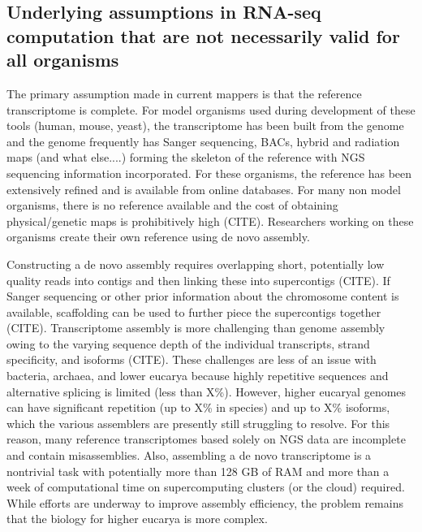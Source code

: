 \documentclass[10pt]{article}
\begin{document}

\subsection*{Underlying assumptions in RNA-seq computation that are not necessarily valid for all organisms}

The primary assumption made in current mappers is that the reference transcriptome is complete.  For model organisms used during development of these tools (human, mouse, yeast), the transcriptome has been built from the genome and the genome frequently has Sanger sequencing, BACs, hybrid and radiation maps (and what else....) forming the skeleton of the reference with NGS sequencing information incorporated.  For these organisms, the reference has been extensively refined and is available from online databases.  For many non model organisms, there is no reference available and the cost of obtaining physical/genetic maps is prohibitively high (CITE).  Researchers working on these organisms create their own reference using de novo assembly.  

Constructing a de novo assembly requires overlapping short, potentially low quality reads into contigs and then linking these into supercontigs (CITE).  If Sanger sequencing or other prior information about the chromosome content is available, scaffolding can be used to further piece the supercontigs together (CITE).  Transcriptome assembly is more challenging than genome assembly owing to the varying sequence depth of the individual transcripts, strand specificity, and isoforms (CITE).  These challenges are less of an issue with bacteria, archaea, and lower eucarya because highly repetitive sequences and alternative splicing is limited (less than X\%).  However, higher eucaryal genomes can have significant repetition (up to X\% in species) and up to X\% isoforms, which the various assemblers are presently still struggling to resolve.  For this reason, many reference transcriptomes based solely on NGS data are incomplete and contain misassemblies.  Also, assembling a de novo transcriptome is a nontrivial task with potentially more than 128 GB of RAM and more than a week of computational time on supercomputing clusters (or the cloud) required.  While efforts are underway to improve assembly efficiency, the problem remains that the biology for higher eucarya is more complex.  
\end{document}
